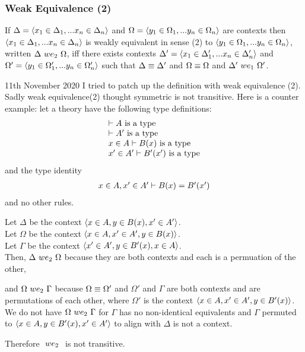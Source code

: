 \documentclass[10pt,a4paper]{scrartcl}
\begin{document}
\subsubsection{Weak Equivalence (2)}
\begin{definition}
If $\Delta=\langle x_1 \in \Delta_1,... x_{n} \in \Delta_{n}\rangle$ and $\Omega = \langle y_1 \in \Omega_1,... y_{n} \in \Omega_{n}\rangle$ are contexts then $\langle x_1 \in \Delta_1,... x_{n} \in \Delta_{n}\rangle$ is weakly equivalent in sense (2) to $\langle y_1 \in \Omega_1,... y_{n} \in \Omega_{n}\rangle$, written $\Delta\ we_2\ \Omega$, iff there exists contexts $\Delta' = \langle x_1 \in \Delta'_1,... x_{n} \in \Delta'_{n}\rangle$ and $\Omega' = \langle y_1 \in \Omega'_1,... y_{n} \in \Omega'_{n}\rangle$ such that
$\Delta \equiv \Delta'$ and $\Omega \equiv \Omega$ and $\Delta'\ we_1\ \Omega'$.
\end{definition}


\begin{framed}
11th November 2020 I tried to patch up the definition with weak equivalence (2).
Sadly weak equivalence(2) thought symmetric is not transitive. Here is a counter example:
let a theory have the following type definitions:
\begin{displaymath}
\begin{array}{l}
\vdash A\mbox{ is a type} \\
\vdash A'\mbox{ is a type} \\
x \in A\vdash B(x)\mbox{ is a type} \\
x' \in A'\vdash B'(x')\mbox{ is a type}
\end{array}
\end{displaymath}
and the type identity
\begin{displaymath}
\begin{array}{l}
x \in A, x' \in A'\vdash B(x)=B'(x')
\end{array}
\end{displaymath}
and no other rules.

Let $\Delta$ be the context $\langle x \in A, y \in B(x), x' \in A'\rangle$. \\

Let $\Omega$ be the context $\langle x \in A, x' \in A', y \in B(x)\rangle$. \\

Let $\Gamma$ be the context $\langle x' \in A', y \in B'(x),  x \in A\rangle$. \\

Then, $\Delta\ we_2\ \Omega$ because they are both contexts and each is a permuation of the other,

and $\Omega\ we_2\ \Gamma$ because $\Omega \equiv \Omega'$ and $\Omega'$ and $\Gamma$ are both contexts and are permutations of each other,
where $\Omega'$ is the context $\langle x \in A, x' \in A', y \in B'(x)\rangle$. \\

We do not have $\Omega\ we_2\ \Gamma$ for $\Gamma$ has no non-identical equivalents and $\Gamma$ permuted to 
$\langle x \in A, y \in B'(x), x' \in A'\rangle$ to align with $\Delta$ is not a context.
 
Therefore $\ we_2\ $ is not transitive.
\end{framed}
\end{document}
